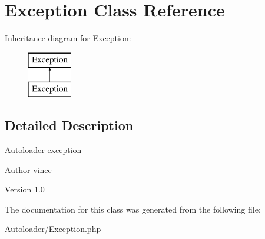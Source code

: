 \hypertarget{class_anemo_1_1_autoloader_1_1_exception}{
\section{Exception Class Reference}
\label{class_anemo_1_1_autoloader_1_1_exception}
}
Inheritance diagram for Exception:\begin{figure}[H]
\begin{center}
\leavevmode
\includegraphics[height=2.000000cm]{class_anemo_1_1_autoloader_1_1_exception}
\end{center}
\end{figure}


\subsection{Detailed Description}
\hyperlink{class_anemo_1_1_autoloader}{Autoloader} exception \begin{DoxyAuthor}{Author}
vince 
\end{DoxyAuthor}
\begin{DoxyVersion}{Version}
1.0 
\end{DoxyVersion}


The documentation for this class was generated from the following file:\begin{DoxyCompactItemize}
\item 
Autoloader/Exception.php\end{DoxyCompactItemize}
